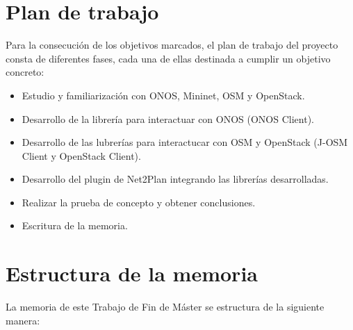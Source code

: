 \section{Plan de trabajo}

Para la consecución de los objetivos marcados, el plan de trabajo del proyecto consta de diferentes fases, cada una de ellas destinada a cumplir un objetivo concreto:

\begin{itemize}
	\item Estudio y familiarización con ONOS, Mininet, OSM y OpenStack.
	\item Desarrollo de la librería para interactuar con ONOS (ONOS Client).
	\item Desarrollo de las lubrerías para interactucar con OSM y OpenStack (J-OSM Client y OpenStack Client).
	\item Desarrollo del plugin de Net2Plan integrando las librerías desarrolladas.
	\item Realizar la prueba de concepto y obtener conclusiones.
	\item Escritura de la memoria.
\end{itemize}

\section{Estructura de la memoria}

La memoria de este Trabajo de Fin de Máster se estructura de la siguiente manera:
\cleardoublepage
	
